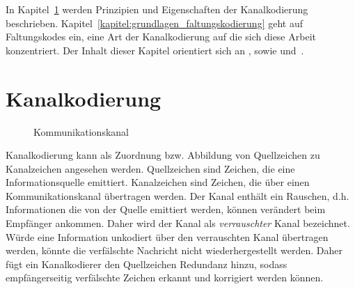 In Kapitel~\ref{kapitel:grundlagen_kanalkodierung} werden Prinzipien und Eigenschaften der Kanalkodierung beschrieben. Kapitel~\ref{kapitel:grundlagen_faltungskodierung} geht auf Faltungskodes ein, eine Art der Kanalkodierung auf die sich diese Arbeit konzentriert. Der Inhalt dieser Kapitel orientiert sich an \cite{huffman2010fundamentals}, sowie \cite{morelos2006art} und~\cite{schonfeld2012informations}.
\section{Kanalkodierung}
\label{kapitel:grundlagen_kanalkodierung}
\begin{figure}[t]
\centering
\resizebox{\textwidth}{!}{%
	
}
\caption{Kommunikationskanal}
\label{abb:kommunikationskanal}
\end{figure}
Kanalkodierung kann als Zuordnung bzw. Abbildung von Quellzeichen zu Kanalzeichen angesehen werden. Quellzeichen sind Zeichen, die eine Informationsquelle emittiert. Kanalzeichen sind Zeichen, die über einen Kommunikationskanal übertragen werden. Der Kanal enthält ein Rauschen, d.h. Informationen die von der Quelle emittiert werden, können verändert beim Empfänger ankommen. Daher wird der Kanal als \emph{verrauschter} Kanal bezeichnet. Würde eine Information unkodiert über den verrauschten Kanal übertragen werden, könnte die verfälschte Nachricht nicht wiederhergestellt werden. Daher fügt ein Kanalkodierer den Quellzeichen Redundanz hinzu, sodass empfängerseitig verfälschte Zeichen erkannt und korrigiert werden können.

